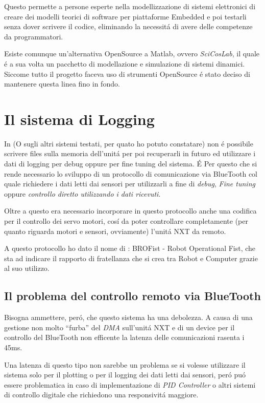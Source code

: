 Questo permette a persone esperte nella
modellizzazione di sistemi elettronici di creare dei modelli teorici di
software per piattaforme Embedded e poi testarli senza dover scrivere il
codice, eliminando la necessit\'a di avere delle competenze da
programmatori.

Esiste comunque un'alternativa OpenSource a Matlab, ovvero \emph{SciCosLab},
il quale \'e a sua volta un pacchetto di modellazione e simulazione di
sistemi dinamici. Siccome tutto il progetto faceva uso
di strumenti OpenSource \'e stato deciso di mantenere questa linea fino in
fondo.

\section{Il sistema di Logging}
In \nxtOSEK{} (O sugli altri sistemi testati, per quato ho potuto
constatare) non \'e possibile scrivere files sulla memoria dell'unit\'a per
poi recuperarli in futuro ed utilizzare i dati di logging per debug oppure
per fine tuning del sistema. \'E Per questo che si rende necessario lo
sviluppo di un protocollo di comunicazione via BlueTooth col quale
richiedere i dati letti dai sensori per utilizzarli a fine di \emph{debug},
\emph{Fine tuning} oppure \emph{controllo diretto utilizzando i dati
ricevuti}.

Oltre a questo era necessario incorporare in questo
protocollo anche una codifica per il controllo dei servo motori, cos\'i da
poter controllare completamente (per quanto riguarda motori e sensori,
ovviamente) l'unit\'a NXT da remoto.

A questo protocollo ho dato il nome di \BROFist{}: BROFist - Robot
Operational Fist, che sta ad indicare il rapporto di fratellanza che si
crea tra Robot e Computer grazie al suo utilizzo.

\subsection{Il problema del controllo remoto via BlueTooth}
Bisogna ammettere, per\'o, che questo sistema ha una debolezza. A causa di
una gestione non molto ``furba'' del \emph{DMA} sull'unit\'a NXT e di un
device per il controllo del BlueTooth non efficente la latenza delle
comunicazioni rasenta i 45ms.

Una latenza di questo tipo non sarebbe un problema se si volesse utilizzare
il sistema solo per il plotting o per il logging dei dati letti dai
sensori, per\'o pu\'o essere problematica in caso di implementazione di
\emph{PID Controller} o altri sistemi di controllo digitale che richiedono
una responsivit\'a maggiore.

